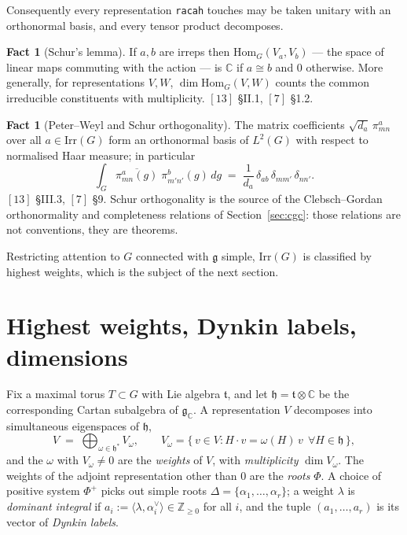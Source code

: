 \documentclass[11pt,a4paper]{article}
\theoremstyle{plain}
\theoremstyle{definition}
\newtheorem{fact}[theorem]{Fact}
\newcommand{\g}{\mathfrak{g}}
\newcommand{\Irr}{\mathrm{Irr}}
\newcommand{\Hom}{\mathrm{Hom}}
\newcommand{\ZZ}{\mathbb{Z}}
\newcommand{\CC}{\mathbb{C}}
\newcommand{\code}[1]{\texttt{#1}}
\begin{document}
Consequently every representation \code{racah} touches may be taken unitary
with an orthonormal basis, and every tensor product decomposes.

\begin{fact}[Schur's lemma]\label{fact:schur}
If $a,b$ are irreps then $\Hom_G(V_a,V_b)$ --- the space of linear maps
commuting with the action --- is $\CC$ if $a\cong b$ and $0$ otherwise. More
generally, for representations $V,W$, $\dim\Hom_G(V,W)$ counts the common
irreducible constituents with multiplicity. $[13]$ \S II.1, $[7]$ \S1.2.
\end{fact}

\begin{fact}[Peter--Weyl and Schur orthogonality]\label{fact:pw}
The matrix coefficients $\sqrt{d_a}\,\pi^a_{mn}$ over all $a\in\Irr(G)$ form an
orthonormal basis of $L^2(G)$ with respect to normalised Haar measure; in
particular
\[
  \int_G \overline{\pi^a_{m n}(g)}\;\pi^b_{m' n'}(g)\,dg
   \;=\; \frac{1}{d_a}\,\delta_{ab}\,\delta_{m m'}\,\delta_{n n'}.
\]
$[13]$ \S III.3, $[7]$ \S9. Schur orthogonality is the source of the
Clebsch--Gordan orthonormality and completeness relations of
Section~\ref{sec:cgc}: those relations are not conventions, they are theorems.
\end{fact}

Restricting attention to $G$ connected with $\g$ simple, $\Irr(G)$ is
classified by highest weights, which is the subject of the next section.

\section{Highest weights, Dynkin labels, dimensions}
\label{sec:hw}

Fix a maximal torus $T\subset G$ with Lie algebra $\mathfrak{t}$, and let
$\mathfrak{h} = \mathfrak{t}\otimes\CC$ be the corresponding Cartan subalgebra
of $\g_\CC$. A representation $V$ decomposes into simultaneous eigenspaces of
$\mathfrak{h}$,
\[
  V \;=\; \bigoplus_{\omega\in\mathfrak{h}^*} V_\omega,
  \qquad
  V_\omega = \{\, v\in V : H\cdot v = \omega(H)\,v \ \ \forall H\in\mathfrak{h}\,\},
\]
and the $\omega$ with $V_\omega\neq 0$ are the \emph{weights} of $V$, with
\emph{multiplicity} $\dim V_\omega$. The weights of the adjoint representation
other than $0$ are the \emph{roots} $\Phi$. A choice of positive system
$\Phi^+$ picks out simple roots $\Delta=\{\alpha_1,\dots,\alpha_r\}$; a weight
$\lambda$ is \emph{dominant integral} if
$a_i := \langle\lambda,\alpha_i^\vee\rangle \in \ZZ_{\ge 0}$ for all $i$, and
the tuple $(a_1,\dots,a_r)$ is its vector of \emph{Dynkin labels}.
\end{document}
